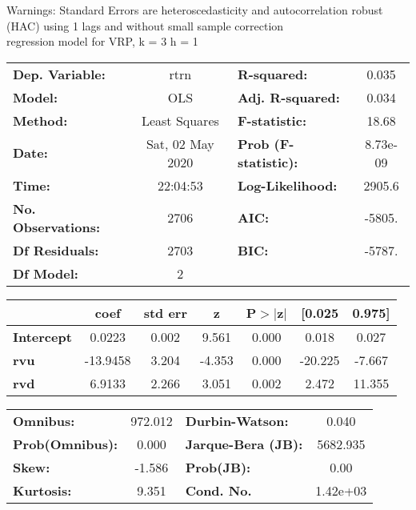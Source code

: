 Warnings: \newline
 [1] Standard Errors are heteroscedasticity and autocorrelation robust (HAC) using 1 lags and without small sample correction\\ 

regression model for VRP, k = 3 h = 1\begin{center}
\begin{tabular}{lclc}
\toprule
\textbf{Dep. Variable:}    &       rtrn       & \textbf{  R-squared:         } &     0.035   \\
\textbf{Model:}            &       OLS        & \textbf{  Adj. R-squared:    } &     0.034   \\
\textbf{Method:}           &  Least Squares   & \textbf{  F-statistic:       } &     18.68   \\
\textbf{Date:}             & Sat, 02 May 2020 & \textbf{  Prob (F-statistic):} &  8.73e-09   \\
\textbf{Time:}             &     22:04:53     & \textbf{  Log-Likelihood:    } &    2905.6   \\
\textbf{No. Observations:} &        2706      & \textbf{  AIC:               } &    -5805.   \\
\textbf{Df Residuals:}     &        2703      & \textbf{  BIC:               } &    -5787.   \\
\textbf{Df Model:}         &           2      & \textbf{                     } &             \\
\bottomrule
\end{tabular}
\begin{tabular}{lcccccc}
                   & \textbf{coef} & \textbf{std err} & \textbf{z} & \textbf{P$> |$z$|$} & \textbf{[0.025} & \textbf{0.975]}  \\
\midrule
\textbf{Intercept} &       0.0223  &        0.002     &     9.561  &         0.000        &        0.018    &        0.027     \\
\textbf{rvu}       &     -13.9458  &        3.204     &    -4.353  &         0.000        &      -20.225    &       -7.667     \\
\textbf{rvd}       &       6.9133  &        2.266     &     3.051  &         0.002        &        2.472    &       11.355     \\
\bottomrule
\end{tabular}
\begin{tabular}{lclc}
\textbf{Omnibus:}       & 972.012 & \textbf{  Durbin-Watson:     } &    0.040  \\
\textbf{Prob(Omnibus):} &   0.000 & \textbf{  Jarque-Bera (JB):  } & 5682.935  \\
\textbf{Skew:}          &  -1.586 & \textbf{  Prob(JB):          } &     0.00  \\
\textbf{Kurtosis:}      &   9.351 & \textbf{  Cond. No.          } & 1.42e+03  \\
\bottomrule
\end{tabular}
\end{center}

